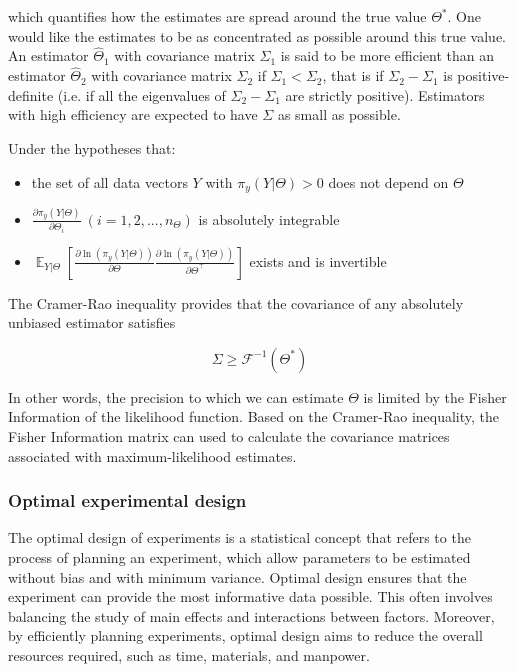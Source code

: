 \documentclass[../Article_Design_of_Experiment.tex]{subfiles}
\begin{document}
	which quantifies how the estimates are spread around the true value $\Theta^*$. One would like the estimates to be as concentrated as possible around this true value. An estimator $\hat{\Theta}_1$ with covariance matrix $\Sigma_1$ is said to be more efficient than an estimator $\hat{\Theta}_2$ with covariance matrix $\Sigma_2$ if $\Sigma_1 < \Sigma_2$, that is if $\Sigma_2 - \Sigma_1$ is positive-definite (i.e. if all the eigenvalues of $\Sigma_2-\Sigma_1$ are strictly positive). Estimators with high efficiency are expected to have $\Sigma$ as small as possible. 
	
	Under the hypotheses that:
	
	\begin{itemize}
		\item the set of all data vectors $Y$ with $\pi_y(Y|\Theta) > 0$ does not depend on $\Theta$
		\item $\frac{\partial \pi_y(Y|\Theta)}{\partial \Theta_i}~\left(i=1,2,...,n_\Theta\right)$ is absolutely integrable
		\item $\mathop{\mathbb{E}}_{Y|\Theta} \left[ \frac{\partial \ln (\pi_y (Y|\Theta))}{\partial \Theta} \frac{\partial \ln (\pi_y (Y|\Theta))}{\partial \Theta^\top} \right]$ exists and is invertible
	\end{itemize}
	
	The Cramer-Rao inequality provides that the covariance of any absolutely unbiased estimator satisfies
	
	{\footnotesize
	\begin{equation}
		\Sigma \geq \mathcal{F}^{-1}(\Theta^*)
	\end{equation} }
	
	In other words, the precision to which we can estimate $\Theta$ is limited by the Fisher Information of the likelihood function. Based on the Cramer-Rao inequality, the Fisher Information matrix can used to calculate the covariance matrices associated with maximum-likelihood estimates.
	
	\subsubsection{Optimal experimental design}
	
	The optimal design of experiments is a statistical concept that refers to the process of planning an experiment, which allow parameters to be estimated without bias and with minimum variance. Optimal design ensures that the experiment can provide the most informative data possible. This often involves balancing the study of main effects and interactions between factors. Moreover, by efficiently planning experiments, optimal design aims to reduce the overall resources required, such as time, materials, and manpower.
	
\end{document}
